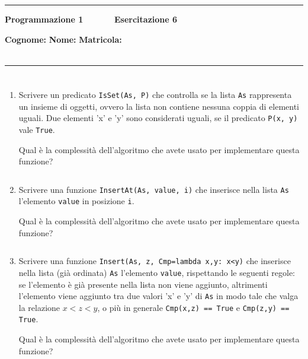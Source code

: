 \documentclass[11pt,a4]{article}
\newcommand{\mybox}[2]{$\quad$\fbox{
\begin{minipage}{#1cm}
\hfill\vspace{#2cm}
\end{minipage}
}}
\begin{document}
\thispagestyle{empty}
\hrule
\begin{center}
   {\Large {\bf Programmazione 1 \hspace{3cm} $\quad \quad \quad$ Esercitazione 6}}
\end{center}
{\bf Cognome: }\hspace{2.5cm} {\bf Nome: } \hspace{2.5cm} {\bf Matricola: } \\\
\hrule

\section*{}

\begin{enumerate}

\item Scrivere un predicato {\tt IsSet(As, P)} che controlla se la lista {\tt As} rappresenta
un insieme di oggetti, ovvero la lista non contiene nessuna coppia di elementi uguali. Due elementi 'x' e 'y'
sono considerati uguali, se il predicato {\tt P(x, y)} vale {\tt True}.

Qual è la complessità dell'algoritmo che avete usato per implementare questa funzione?

\mybox{15}{2.75}

\item Scrivere una funzione {\tt InsertAt(As, value, i)} che inserisce nella lista {\tt As} l'elemento {\tt value}
in posizione {\tt i}.

Qual è la complessità dell'algoritmo che avete usato per implementare questa funzione?

\mybox{15}{2.75}

\item Scrivere una funzione {\tt Insert(As, z, Cmp=lambda x,y: x<y)} che inserisce nella lista (già ordinata)
{\tt As} l'elemento {\tt value},
rispettando le seguenti regole: se l'elemento è già presente nella lista non viene aggiunto,
altrimenti l'elemento viene aggiunto tra due valori 'x' e 'y' di {\tt As} in modo tale che 
valga la relazione $x < z < y$, o più in generale {\tt Cmp(x,z) == True} e {\tt Cmp(z,y) == True}.

Qual è la complessità dell'algoritmo che avete usato per implementare questa funzione?


\end{enumerate}
\end{document}
